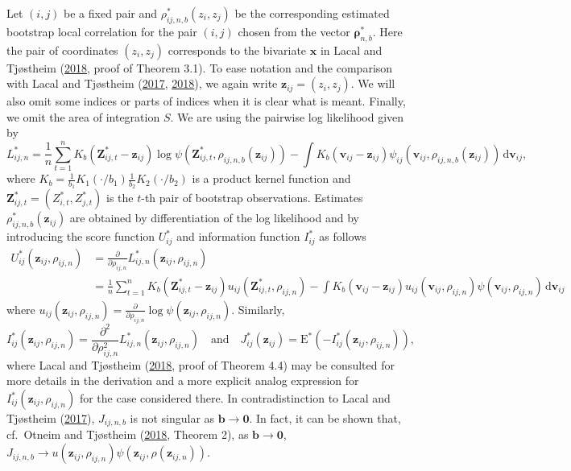 \documentclass[
  12pt,
  letterpaper]{article}
\numberwithin{equation}{section}
\newcommand{\x}{\bm{x}}
\newcommand{\Z}{\bm{Z}}
\newcommand{\z}{\bm{z}}
\newcommand{\fv}{\bm{v}}
\newcommand{\frho}{\bm{\rho}}
\newcommand{\bb}{\bm{b}}
\newcommand{\E}{\textrm{E}}
\newcommand{\di}{\,\textrm{d}}
\begin{document}
Let \((i,j)\) be a fixed pair and \(\rho_{ij,n,b}^*(z_i,z_j)\) be the corresponding estimated bootstrap local correlation for the pair \((i,j)\) chosen from the vector \(\frho_{n,b}^*\). Here the pair of coordinates \((z_i,z_j)\) corresponds to the bivariate \(\x\) in Lacal and Tjøstheim (\protect\hyperlink{ref-lacal2018estimating}{2018}, proof of Theorem 3.1). To ease notation and the comparison with Lacal and Tjøstheim (\protect\hyperlink{ref-lacal2017local}{2017}, \protect\hyperlink{ref-lacal2018estimating}{2018}), we again write \(\z_{ij} = (z_i,z_j)\). We will also omit some indices or parts of indices when it is clear what is meant. Finally, we omit the area of integration \(S\). We are using the pairwise log likelihood given by
\[
L_{ij,n}^* = \frac{1}{n} \sum_{t=1}^{n} K_b(\Z_{ij,t}^{*}-\z_{ij}) \log \psi(\Z_{ij,t}^{*},\rho_{ij,n,b}(\z_{ij})) - \int K_b(\fv_{ij}-\z_{ij}) \psi_{ij}(\fv_{ij},\rho_{ij,n,b}(\z_{ij})) \di \fv_{ij},
\]
where \(K_b = \frac{1}{b_1}K_1(\cdot/b_1) \frac{1}{b_2} K_2(\cdot/b_2)\) is a product kernel function and \(\Z_{ij,t}^{*} = \left(Z_{i,t}^{*},Z_{j,t}^{*}\right)\) is the \(t\)-th pair of bootstrap observations. Estimates \(\rho_{ij,n,b}^*(\z_{ij})\) are obtained by differentiation of the log likelihood and by introducing the score function \(U_{ij}^*\) and information function \(I_{ij}^*\) as follows
\begin{align*}
U_{ij}^*(\z_{ij},\rho_{ij,n}) &= \frac{\partial}{\partial \rho_{ij,n}}L_{ij,n}^*(\z_{ij},\rho_{ij,n}) \\
& = \frac{1}{n}\sum_{t=1}^{n}K_b(\Z_{ij,t}^{*} - \z_{ij})u_{ij}(\Z_{ij,t}^{*},\rho_{ij,n}) - 
\int K_b(\fv_{ij} - \z_{ij})u_{ij}(\fv_{ij},\rho_{ij,n})\psi(\fv_{ij},\rho_{ij,n}) \di \fv_{ij}
\end{align*}
where \(u_{ij}(\z_{ij},\rho_{ij,n}) = \frac{\partial}{\partial \rho_{ij,n}}\log \psi(\z_{ij},\rho_{ij,n})\). Similarly,
\[
I_{ij}^*(\z_{ij},\rho_{ij,n}) = \frac{\partial^2}{\partial \rho_{ij,n}^2} L_{ij,n}^{*}(\z_{ij},\rho_{ij,n}) \quad \mbox{and} \quad J_{ij}^*(\z_{ij}) = \E^*\left(-I_{ij}^*(\z_{ij},\rho_{ij,n})\right),
\]
where Lacal and Tjøstheim (\protect\hyperlink{ref-lacal2018estimating}{2018}, proof of Theorem 4.4) may be consulted for more details in the derivation and a more explicit analog expression for \(I_{ij}^*(\z_{ij},\rho_{ij,n})\) for the case considered there. In contradistinction to Lacal and Tjøstheim (\protect\hyperlink{ref-lacal2017local}{2017}), \(J_{ij,n,b}\) is not singular as \(\bb \to \bm{0}\). In fact, it can be shown that, cf.~Otneim and Tjøstheim (\protect\hyperlink{ref-otneim2017conditional}{2018}, Theorem 2), as \(\bb \to \bm{0}\), \(J_{ij,n,b} \to u(\z_{ij},\rho_{ij,n})\psi(\z_{ij},\rho(\z_{ij,n}))\).
\end{document}
